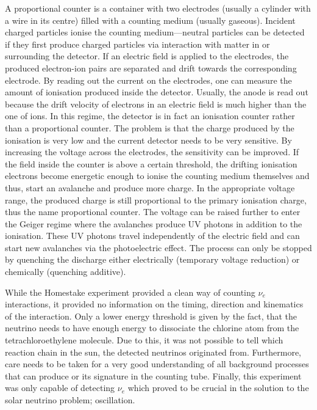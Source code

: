A proportional counter is a container with two electrodes (usually a cylinder with a wire in its centre) filled with a counting medium (usually gaseous).
Incident charged particles ionise the counting medium---neutral particles can be detected if they first produce charged particles via interaction with matter in or surrounding the detector.
If an electric field is applied to the electrodes, the produced electron-ion pairs are separated and drift towards the corresponding electrode.
By reading out the current on the electrodes, one can measure the amount of ionisation produced inside the detector.
Usually, the anode is read out because the drift velocity of electrons in an electric field is much higher than the one of ions.
In this regime, the detector is in fact an ionisation counter rather than a proportional counter.
The problem is that the charge produced by the ionisation is very low and the current detector needs to be very sensitive.
By increasing the voltage across the electrodes, the sensitivity can be improved.
If the field inside the counter is above a certain threshold, the drifting ionisation electrons become energetic enough to ionise the counting medium themselves and thus, start an avalanche and produce more charge.
In the appropriate voltage range, the produced charge is still proportional to the primary ionisation charge, thus the name proportional counter.
The voltage can be raised further to enter the Geiger regime where the avalanches produce UV photons in addition to the ionisation.
These UV photons travel independently of the electric field and can start new avalanches via the photoelectric effect.
The process can only be stopped by quenching the discharge either electrically (temporary voltage reduction) or chemically (quenching additive).

While the Homestake experiment provided a clean way of counting $\nu_e$ interactions, it provided no information on the timing, direction and kinematics of the interaction.
Only a lower energy threshold is given by the fact, that the neutrino needs to have enough energy to dissociate the chlorine atom from the tetrachloroethylene molecule.
Due to this, it was not possible to tell which reaction chain in the sun, the detected neutrinos originated from.
Furthermore, care needs to be taken for a very good understanding of all background processes that can produce  or its signature in the counting tube.
Finally, this experiment was only capable of detecting $\nu_e$ which proved to be crucial in the solution to the solar neutrino problem; oscillation.


